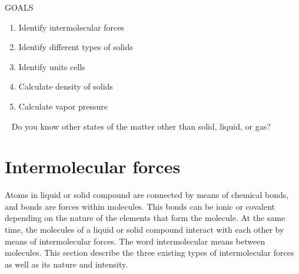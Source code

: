 \documentclass[main.tex]{subfiles}
\begin{document}
\begin{marginfigure}%
\begin{mytcbox}{GOALS}
\begin{enumerate}[label=\protect\circled{\color{white}\arabic*}]
\item Identify intermolecular forces
\item Identify different types of solids
\item Identify units cells
\item Calculate density of solids
\item Calculate vapor pressure
\end{enumerate}
\end{mytcbox}
\vspace{1cm}
\begin{tcolorbox}[enhanced,colback=red!5!white,colframe=black!50!red,boxrule=1pt,
  arc=0pt,outer arc=0pt,drop heavy lifted shadow]
\faGears\ 
 Do you know other states of the matter other than solid, liquid, or gas?

  \end{tcolorbox}
\end{marginfigure}%



\section{Intermolecular forces}
Atoms in liquid or solid compound are connected by means of chemical bonds, and bonds are forces within molecules. This bonds can be ionic or covalent depending on the nature of the elements that form the molecule. At the same time, the molecules of a liquid or solid compound interact with each other by means of intermolecular forces. The word intermolecular means between molecules. This section describe the three existing types of intermolecular forces as well as its nature and intensity.
\end{document}

